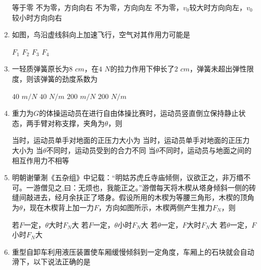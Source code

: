 \begin{enumerate}[leftmargin=0em]
\fourchoices
{等于零}
{不为零，方向向右}
{不为零，方向向左}
{不为零，$ v_{0} $较大时方向向左，$ v_{0} $较小时方向向右}



\item 
{}
如图，鸟沿虚线斜向上加速飞行，空气对其作用力可能是  
\begin{figure}[h!]
\centering

\end{figure}

\fourchoices
{$ F_{1} $}
{$ F_{2} $}
{$ F_{3} $}
{$ F_{4} $}


\item 
{}
一轻质弹簧原长为$ 8 $ $ cm $，在$ 4 $ $ N $的拉力作用下伸长了$ 2 $ $ cm $，弹簧未超出弹性限度，则该弹簧的劲度系数为  


\fourchoices
{$ 40 $ $ m/N $ }
{$ 40 $ $ N/m $}
{$ 200 $ $ m/N $ }
{$ 200 $ $ N/m $}


\item 
{}
重力为$ G $的体操运动员在进行自由体操比赛时，运动员竖直倒立保持静止状态，两手臂对称支撑，夹角为$ \theta $，则  


\fourchoices
{当时，运动员单手对地面的正压力大小为}
{当时，运动员单手对地面的正压力大小为}
{当$ \theta $不同时，运动员受到的合力不同}
{当$ \theta $不同时，运动员与地面之间的相互作用力不相等}


\item 
{}
明朝谢肇淛《五杂组》中记载：“明姑苏虎丘寺庙倾侧，议欲正之，非万缗不可。一游僧见之,曰：无烦也，我能正之。”游僧每天将木楔从塔身倾斜一侧的砖缝间敲进去，经月余扶正了塔身。假设所用的木楔为等腰三角形，木楔的顶角为$ \theta $，现在木楔背上加一力$ F $，方向如图所示，木楔两侧产生推力$ F_{N} $，则  
\begin{figure}[h!]
\centering

\end{figure}

\fourchoices
{若$ F $一定，$ \theta $大时$ F_{N} $大}
{若$ F $一定，$ \theta $小时$ F_{N} $大}
{若$ \theta $一定，$ F $大时$ F_{N} $大}
{若$ \theta $一定，$ F $小时$ F_{N} $大}

\item 
{}
重型自卸车利用液压装置使车厢缓慢倾斜到一定角度，车厢上的石块就会自动滑下，以下说法正确的是  
\begin{figure}[h!]
\centering

\end{figure}



\end{enumerate}
